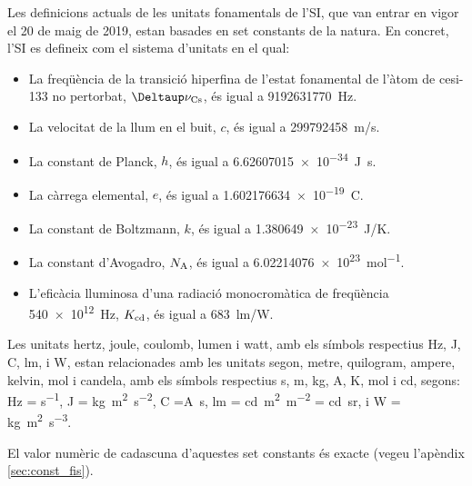 Les definicions actuals de les unitats fonamentals de l'SI, que van entrar en vigor el 20 de maig de 2019, estan basades en set constants de la natura. En concret, l'SI es defineix com el  sistema d'unitats en el qual:
\begin{itemize}

\item La freqüència de la transició hiperfina de l'estat fonamental de l'àtom de cesi-133 no pertorbat, $\Deltaup\nu\ped{Cs}$, és igual a \SI{9 192 631 770}{Hz}.
\item La velocitat de la llum en el buit, $c$, és igual a \SI{299792458}{m/s}.
\item La constant de Planck, $h$, és igual a \SI{6,62607015 e-34}{J.s}.
\item La càrrega elemental, $e$, és igual a \SI{1,602176634 e-19}{C}.
\item La constant de Boltzmann, $k$, és igual a \SI{1,380649e-23}{J/K}.
\item La constant d'Avogadro, $N_\mathrm{A}$, és igual a \SI{6,02214076 e23}{mol^{-1}}.
\item L'eficàcia lluminosa d'una radiació monocromàtica de freqüència \SI{540e12}{Hz},  $K_\mathrm{cd}$, és igual a \SI{683}{lm/W}.
\end{itemize}
 
 


Les unitats  hertz, joule, coulomb, lumen i watt, amb els símbols respectius Hz, J, C, lm, i W, estan relacionades amb les unitats segon, metre, quilogram, ampere, kelvin, mol i candela, amb els símbols respectius s, m, kg, A, K, mol i cd, segons:  Hz = \si{s^{-1}}, J = \si{kg.m^2.s^{-2}}, C =\si{A.s}, lm = \si{cd.m^2.m^{-2}} = \si{cd.sr}, i W = \si{kg.m^2.s^{-3}}.

El valor numèric de cadascuna d'aquestes set constants és exacte (vegeu l'apèndix \vref{sec:const_fis}).

